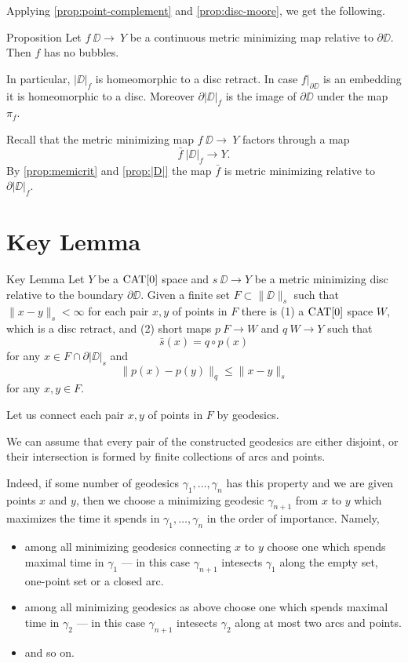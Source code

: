 \documentclass{article}
\begin{document}
Applying \ref{prop:point-complement} and \ref{prop:disc-moore}, we get the following.

\begin{thm}{Proposition}\label{prop:|D|}
Let $f\:\DD\to\ Y$ be a continuous metric minimizing map relative to $\partial \DD$.
Then $f$ has no bubbles.

In particular,  $|\DD|_f$ is homeomorphic to a disc retract. 
In case $f|_{\partial\DD}$ is an
embedding it is homeomorphic to a disc.
Moreover $\partial|\DD|_f$ is the image of $\partial \DD$
under the map $\pi_f$.
\end{thm}

Recall that the metric minimizing map $f\:\DD\to\ Y$ factors through a map \[\bar f\:|\DD|_f\to Y.\]
By \ref{prop:memicrit} and \ref{prop:|D|} 
the map $\bar f$
is metric minimizing relative to $\partial|\DD|_f$.











\section{Key Lemma}\label{Key Lemma}


\begin{thm}{Key Lemma}\label{lem:key}
Let $Y$ be a $\mathop{\rm CAT}\nolimits[0]$ space and $s\:\DD\to Y$ 
be a metric minimizing disc relative to the boundary $\partial \DD$.
Given a finite set $F\subset \|\DD\|_s$ such that $\|x-y\|_s<\infty$ for each pair $x,y$ of points in $F$
there is 
(1) a $\mathop{\rm CAT}\nolimits[0]$ space $W$, which is a disc retract,
and (2) short maps $p\:F\to W$ and $q\:W\to Y$ such that
\[\bar s(x)=q\circ p(x)\] 
for any $x\in F\cap \partial |\DD|_s$
and 
\[\|p(x)-p(y)\|_q\le \|x-y\|_s\] 
for any $x,y\in F$.
\end{thm}

Let us connect each pair $x,y$ of points in $F$ by geodesics.

We can assume that 
every pair of the constructed geodesics 
are either disjoint, or their intersection is formed by finite collections of arcs and points.

Indeed, if some number of geodesics $\gamma_1,\dots,\gamma_n$ has this property and we are given points $x$ and $y$, then
we choose a minimizing geodesic $\gamma_{n+1}$ from $x$ to $y$ which maximizes the time it spends in $\gamma_1,\dots,\gamma_n$  in the order of importance.
Namely, 
\begin{itemize}
\item  among all minimizing geodesics connecting $x$ to $y$
choose one which spends maximal time in $\gamma_1$ --- in this case $\gamma_{n+1}$ intesects $\gamma_1$ along the empty set, one-point set or a closed arc.
\item among all minimizing geodesics as above
choose one which spends maximal time in $\gamma_2$ --- in this case $\gamma_{n+1}$ intesects $\gamma_2$ along at most two arcs and points.
\item and so on.
\end{itemize}
\end{document}
